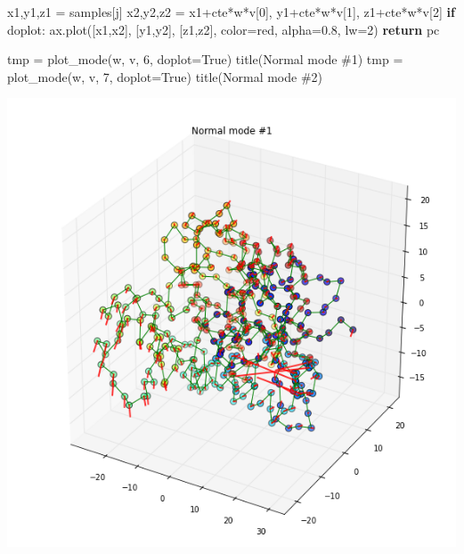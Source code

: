 \documentclass[
]{article}
\newenvironment{Shaded}{}{}
\newcommand{\ControlFlowTok}[1]{\textcolor[rgb]{0.00,0.44,0.13}{\textbf{#1}}}
\newcommand{\DecValTok}[1]{\textcolor[rgb]{0.25,0.63,0.44}{#1}}
\newcommand{\FloatTok}[1]{\textcolor[rgb]{0.25,0.63,0.44}{#1}}
\newcommand{\NormalTok}[1]{#1}
\newcommand{\OperatorTok}[1]{\textcolor[rgb]{0.40,0.40,0.40}{#1}}
\newcommand{\StringTok}[1]{\textcolor[rgb]{0.25,0.44,0.63}{#1}}
\newcommand{\VariableTok}[1]{\textcolor[rgb]{0.10,0.09,0.49}{#1}}
\begin{document}
\begin{Shaded}
\begin{Highlighting}[]
\NormalTok{        x1,y1,z1 }\OperatorTok{=}\NormalTok{ samples[j]}
\NormalTok{        x2,y2,z2 }\OperatorTok{=}\NormalTok{ x1}\OperatorTok{+}\NormalTok{cte}\OperatorTok{*}\NormalTok{w}\OperatorTok{*}\NormalTok{v[}\DecValTok{0}\NormalTok{], y1}\OperatorTok{+}\NormalTok{cte}\OperatorTok{*}\NormalTok{w}\OperatorTok{*}\NormalTok{v[}\DecValTok{1}\NormalTok{], z1}\OperatorTok{+}\NormalTok{cte}\OperatorTok{*}\NormalTok{w}\OperatorTok{*}\NormalTok{v[}\DecValTok{2}\NormalTok{]}
        \ControlFlowTok{if}\NormalTok{ doplot:}
\NormalTok{            ax.plot([x1,x2], [y1,y2], [z1,z2], color}\OperatorTok{=}\StringTok{\textquotesingle{}red\textquotesingle{}}\NormalTok{, alpha}\OperatorTok{=}\FloatTok{0.8}\NormalTok{, lw}\OperatorTok{=}\DecValTok{2}\NormalTok{)}
    \ControlFlowTok{return}\NormalTok{ pc}


\NormalTok{tmp }\OperatorTok{=}\NormalTok{ plot\_mode(w, v, }\DecValTok{6}\NormalTok{, doplot}\OperatorTok{=}\VariableTok{True}\NormalTok{)}
\NormalTok{title(}\StringTok{\textquotesingle{}Normal mode \#1\textquotesingle{}}\NormalTok{)}
\NormalTok{tmp }\OperatorTok{=}\NormalTok{ plot\_mode(w, v, }\DecValTok{7}\NormalTok{, doplot}\OperatorTok{=}\VariableTok{True}\NormalTok{)}
\NormalTok{title(}\StringTok{\textquotesingle{}Normal mode \#2\textquotesingle{}}\NormalTok{)}
\end{Highlighting}
\end{Shaded}

\includegraphics{figures/normal_modes_29_0.png}
\end{document}
